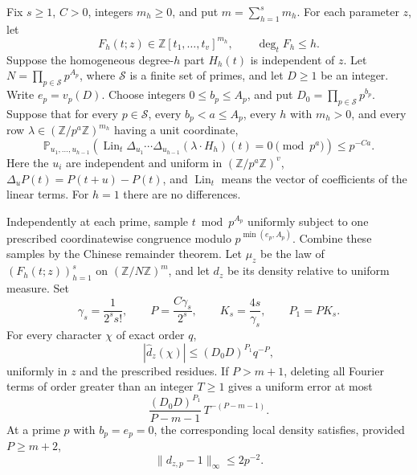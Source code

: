 \begin{lemma}\label{cube:modular-decay}
Fix $s\geq1$, $C>0$, integers $m_h\geq0$, and put $m=\sum_{h=1}^s m_h$.
For each parameter $z$, let
\[
 F_h(t;z)\in\mathbb Z[t_1,\ldots,t_v]^{m_h},\qquad \deg_t F_h\leq h.
\]
Suppose the homogeneous degree-$h$ part $H_h(t)$ is independent of $z$.
Let $N=\prod_{p\in\mathcal S}p^{A_p}$, where $\mathcal S$ is a finite set
of primes, and let $D\geq1$ be an integer.  Write $e_p=v_p(D)$.
Choose integers $0\leq b_p\leq A_p$, and put $D_0=\prod_{p\in\mathcal S}p^{b_p}$.
Suppose that for every $p\in\mathcal S$, every $b_p<a\leq A_p$, every
$h$ with $m_h>0$, and every row
$\lambda\in(\mathbb Z/p^a\mathbb Z)^{m_h}$ having a unit coordinate,
\begin{equation}\label{cube:modular-rank-hyp}
 \mathbb P_{u_1,\ldots,u_{h-1}}
 \left(\operatorname{Lin}_t
   \Delta_{u_1}\cdots\Delta_{u_{h-1}}(\lambda\cdot H_h)(t)=0
            \pmod {p^a}\right)\leq p^{-Ca}.
\end{equation}
Here the $u_i$ are independent and uniform in $(\mathbb Z/p^a\mathbb Z)^v$,
$\Delta_u P(t)=P(t+u)-P(t)$, and $\operatorname{Lin}_t$ means the vector
of coefficients of the linear terms.  For $h=1$ there are no differences.

Independently at each prime, sample $t\bmod p^{A_p}$ uniformly subject to
one prescribed coordinatewise congruence modulo $p^{\min(e_p,A_p)}$.
Combine these samples by the Chinese remainder theorem.  Let $\mu_z$ be the
law of $(F_h(t;z))_{h=1}^s$ on $(\mathbb Z/N\mathbb Z)^m$, and let $d_z$ be
its density relative to uniform measure.  Set
\[
 \gamma_s=\frac1{2^s s!},\qquad
 P=\frac{C\gamma_s}{2^s},\qquad
 K_s=\frac{4s}{\gamma_s},\qquad P_1=PK_s.
\]
For every character $\chi$ of exact order $q$,
\begin{equation}\label{cube:modular-fourier-decay}
 |\widehat d_z(\chi)|\leq (D_0D)^{P_1}q^{-P},
\end{equation}
uniformly in $z$ and the prescribed residues.
If $P>m+1$, deleting all Fourier terms of order greater than an integer
$T\geq1$ gives a uniform error at most
\begin{equation}\label{cube:modular-fourier-tail}
 \frac{(D_0D)^{P_1}}{P-m-1}\,T^{-(P-m-1)}.
\end{equation}
At a prime $p$ with $b_p=e_p=0$, the corresponding local density satisfies,
provided $P\geq m+2$,
\begin{equation}\label{cube:uncharged-prime-density}
 \|d_{z,p}-1\|_\infty\leq 2p^{-2}.
\end{equation}
\end{lemma}

